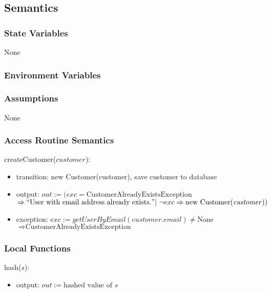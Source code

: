 \documentclass[12pt, titlepage]{article}
\begin{document}
\subsection{Semantics}

\subsubsection{State Variables}

None

\subsubsection{Environment Variables}

\subsubsection{Assumptions}

None

\subsubsection{Access Routine Semantics}

\noindent createCustomer($customer$):
\begin{itemize}
	\item transition: new Customer(customer), save customer to database
	\item output: $out := (exc = \text{CustomerAlreadyExistsException}$ \\ $\Rightarrow ``\text{User with
			      email address already exists.}" |\ \neg exc \Rightarrow \text{new Customer(\emph{customer})})$
	\item exception: $exc := getUserByEmail(customer.email) \neq \text{None}$ \\ $\Rightarrow
		      \text{CustomerAlreadyExistsException}$
\end{itemize}

\subsubsection{Local Functions}

\noindent hash($s$):
\begin{itemize}
	\item output: $out := \text{hashed value of } s$
\end{itemize}

\end{document}
